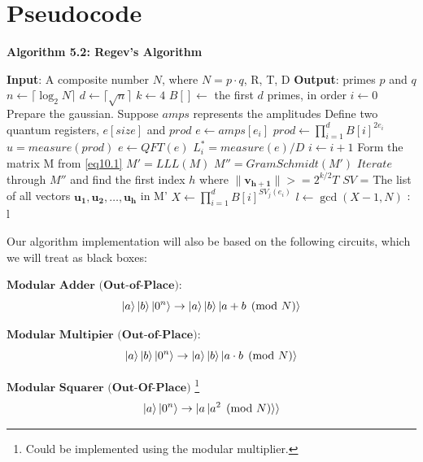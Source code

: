 \chapter{Pseudocode}

\noindent\textbf{Algorithm 5.2: Regev's Algorithm}
\begin{algorithmic}[1]
\State \textbf{Input}: A composite number $N$, where $N = p\cdot q$, R, T, D
\State \textbf{Output}: primes $p$ and $q$
\State $n \gets \lceil \log_2 N \rceil$
\State $d \gets \lceil \sqrt{n} \rceil$
\State $k \gets 4$
\State $B[] \gets$ the first $d$ primes, in order
\State $i \gets 0$
    \State Prepare the gaussian. Suppose $amps$ represents the amplitudes
    \State Define two quantum registers, $e[size]$ and $prod$
    \State $e \gets amps[e_i]$
    \State $prod \gets \prod_{i=1}^d B[i]^{2e_i}$ 
    \State $u = measure(prod)$ 
    \State $e \gets QFT(e)$
    \State $L^*_i = measure(e) / D$
    \State $i \gets i + 1$
\EndWhile
{}
\State Form the matrix M from \eqref{eq10.1}
\State $M' = LLL(M)$
\State $M'' = GramSchmidt(M')$
\State $Iterate$ through $M''$ and find the first index $h$ where $\lVert \mathbf{v_{h+1}} \rVert >=2^{k/2}T$ 
\State $SV$ = The list of all vectors $\mathbf{u_1,u_2,\dots,u_h}$ in M'
    \State $X \gets \prod_{i=1}^{d} B[i]^{SV_j(e_i)}$
    \State $l \gets \gcd(X-1,N) $
    :
        \State \Return l
    \EndIf
\EndFor
\State {}

\end{algorithmic}
\vspace{2cm}

Our algorithm implementation will also be based on the following circuits, which we will treat as black boxes:

$\textbf{Modular Adder (Out-of-Place)}$:
$$\ket{a} \ket{b} \ket{0^n} \to \ket{a} \ket{b} \ket{a + b \pmod N}$$

$\textbf{Modular Multipier (Out-of-Place)}$:
$$\ket{a} \ket{b} \ket{0^n} \to \ket{a} \ket{b} \ket{a \cdot b \pmod N}$$

$\textbf{Modular Squarer (Out-Of-Place)}$ \footnote{Could be implemented using the modular multiplier.}
$$\ket{a} \ket{0^n} \to \ket{a \ket{a^2 \pmod N}}$$
